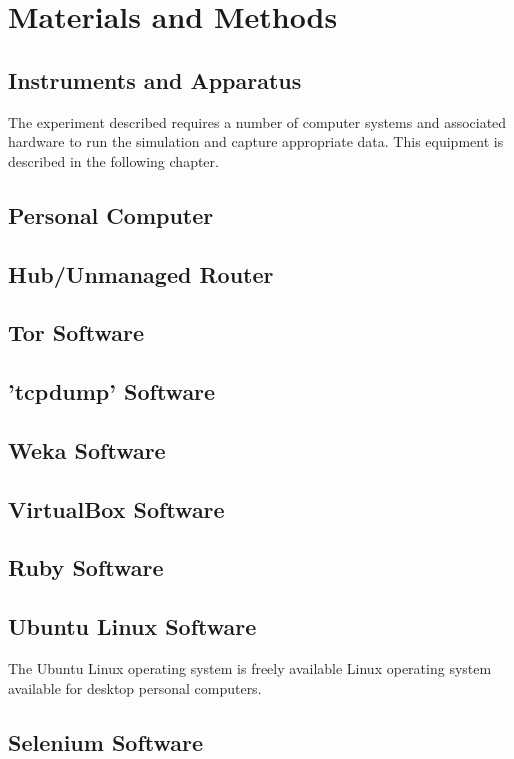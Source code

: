 
\chapter{Materials and Methods}

\section{Instruments and Apparatus}

The experiment described requires a number of computer systems and associated hardware to run the simulation and capture appropriate data. This equipment is described in the following chapter.

\section{Personal Computer}


\section{Hub/Unmanaged Router}
\section{Tor Software}
\section{'tcpdump' Software}
\section{Weka Software}
\section{VirtualBox Software}
\section{Ruby Software}

\section{Ubuntu Linux Software}

The Ubuntu Linux operating system is freely available Linux operating system
available for desktop personal computers.


\section{Selenium Software}

